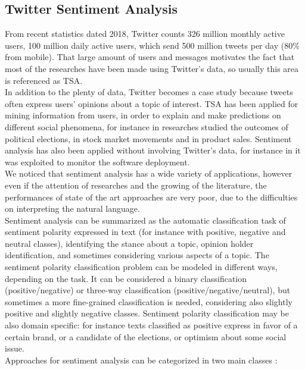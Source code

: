 \subsection{Twitter Sentiment Analysis}
From recent statistics dated 2018, Twitter counts 326 million monthly active users, 100 million daily active users, which send 500 million tweets per day (80\% from mobile). That large amount of users and messages motivates the fact that most of the researches have been made using Twitter's data, so usually this area is referenced as \ac{TSA}.\\
In addition to the plenty of data, Twitter becomes a case study because tweets often express users' opinions about a topic of interest. \ac{TSA} has been applied for mining information from users, in order to explain and make predictions on different social phenomena, for instance in \cite{bermingham-smeaton-2011-using} researches studied the outcomes of political elections, in \cite{bollen2011twitter} stock market movements and in \cite{Rui:2013:WCM:2528554.2528633} product sales. Sentiment analysis has also been applied without involving Twitter's data, for instance in \cite{JURADO201582} it was exploited to monitor the software deployment.\\
We noticed that sentiment analysis has a wide variety of applications, however even if the attention of researches and the growing of the literature, the performances of state of the art approaches are very poor, due to the difficulties on interpreting the natural language.\\
Sentiment analysis can be summarized as the automatic classification task of sentiment polarity expressed in text (for instance with positive, negative and neutral classes), identifying the stance about a topic, opinion holder identification, and sometimes considering various aspects of a topic. The sentiment polarity classification problem can be modeled in different ways, depending on the task. It can be considered a binary classification (positive/negative) or three-way classification (positive/negative/neutral), but sometimes a more fine-grained classification is needed, considering also slightly positive and slightly negative classes. Sentiment polarity classification may be also domain specific: for instance texts classified as positive express in favor of a certain brand, or a candidate of the elections, or optimism about some social issue.\\
Approaches for sentiment analysis can be categorized in two main classes \cite{Zimbra:2018:STS:3210372.3185045}:
